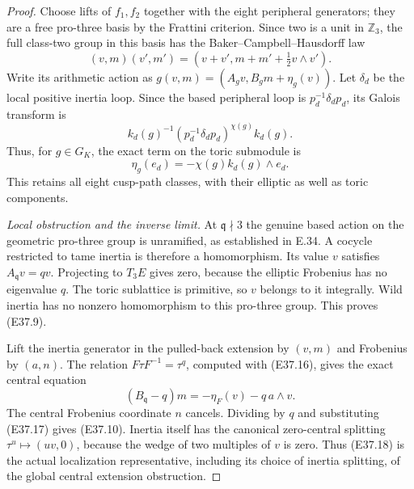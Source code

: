 \begin{proof}
Choose lifts of $f_1,f_2$ together with the eight
peripheral generators; they are a free pro-three basis
by the Frattini criterion. Since two is a unit in
$\mathbb Z_3$, the full class-two group in this basis
has the Baker--Campbell--Hausdorff law
\[
 (v,m)(v',m')=(v+v',m+m'+\tfrac12v\wedge v').
 \tag{E37.16}
\]
Write its arithmetic action as
$g(v,m)=(A_gv,B_gm+\eta_g(v))$.
Let $\delta_d$ be the local positive inertia loop.
Since the based peripheral loop is
$p_d^{-1}\delta_dp_d$, its Galois transform is
\[
 k_d(g)^{-1}(p_d^{-1}\delta_dp_d)^{\chi(g)}k_d(g).
\]
Thus, for $g\in G_K$, the exact term on the toric
submodule is
\[
 \eta_g(e_d)=-\chi(g)k_d(g)\wedge e_d.
 \tag{E37.17}
\]
This retains all eight cusp-path classes, with their
elliptic as well as toric components.

\emph{Local obstruction and the inverse limit.}
At $\mathfrak q\nmid3$ the genuine based action on the
geometric pro-three group is unramified, as established
in E.34. A cocycle restricted to tame inertia is
therefore a homomorphism. Its value $v$ satisfies
$A_{\mathfrak q}v=qv$. Projecting to $T_3E$ gives zero,
because the elliptic Frobenius has no eigenvalue $q$.
The toric sublattice is primitive, so $v$ belongs to
it integrally. Wild inertia has no nonzero homomorphism
to this pro-three group. This proves (E37.9).

Lift the inertia generator in the pulled-back
extension by $(v,m)$ and Frobenius by $(a,n)$.
The relation $F\tau F^{-1}=\tau^q$, computed with
(E37.16), gives the exact central equation
\[
 (B_{\mathfrak q}-q)m
       =-\eta_F(v)-q\,a\wedge v .
 \tag{E37.18}
\]
The central Frobenius coordinate $n$ cancels.
Dividing by $q$ and substituting (E37.17) gives
(E37.10). Inertia itself has the canonical zero-central
splitting $\tau^u\mapsto(uv,0)$, because the wedge of
two multiples of $v$ is zero. Thus (E37.18) is the
actual localization representative, including its
choice of inertia splitting, of the global central
extension obstruction.


\end{proof}
